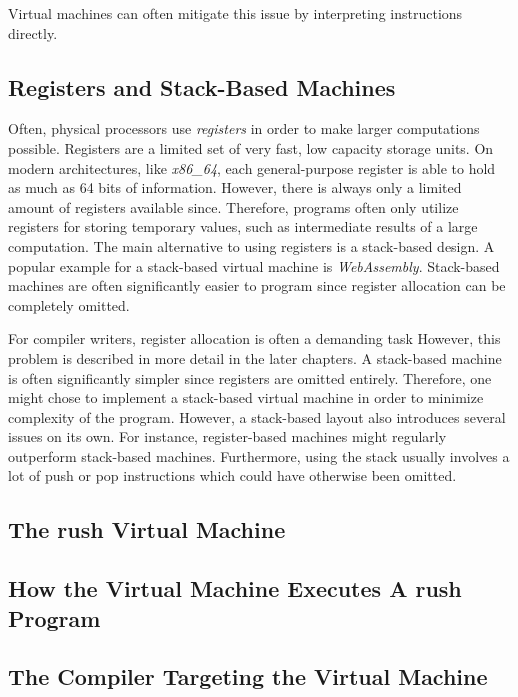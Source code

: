 Virtual machines can often mitigate this issue by interpreting instructions directly.

\subsection{Registers and Stack-Based Machines}

Often, physical processors use \emph{registers} in order to make larger computations possible.
Registers are a limited set of very fast, low capacity storage units.
On modern architectures, like \emph{x86\_64}, each general-purpose register is able to hold as much as 64 bits of information.
However, there is always only a limited amount of registers available since.
Therefore, programs often only utilize registers for storing temporary values, such as intermediate results of a large computation.
The main alternative to using registers is a stack-based design.
A popular example for a stack-based virtual machine is \emph{WebAssembly}.
Stack-based machines are often significantly easier to program since register allocation can be completely omitted.

For compiler writers, register allocation is often a demanding task
However, this problem is described in more detail in the later chapters.
A stack-based machine is often significantly simpler since registers are omitted entirely.
Therefore, one might chose to implement a stack-based virtual machine in order to minimize complexity of the program.
However, a stack-based layout also introduces several issues on its own.
For instance, register-based machines might regularly outperform stack-based machines.
Furthermore, using the stack usually involves a lot of push or pop instructions which could have otherwise been omitted.

\subsection{The rush Virtual Machine}

\subsection{How the Virtual Machine Executes A rush Program}
\subsection{The Compiler Targeting the Virtual Machine}
